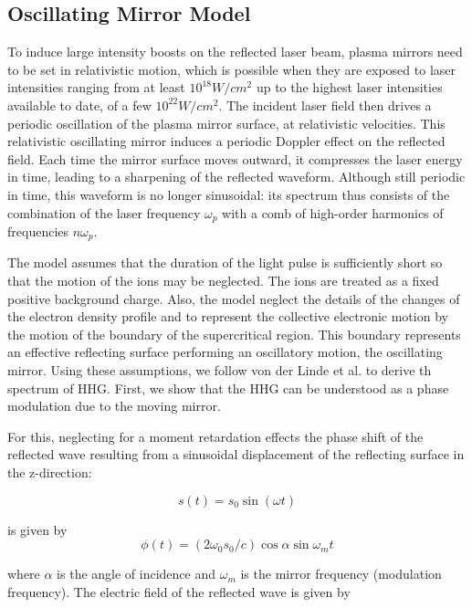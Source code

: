 \documentclass[12pt]{article}
\begin{document}
\subsection{Oscillating Mirror Model}
To induce large intensity boosts on the reflected laser beam, plasma mirrors need to be set in relativistic motion, which is possible when they are exposed to laser intensities ranging from at least $10^{18} W/cm^2$ up to the highest laser intensities available to date, of a few $10^{22} W/cm^2$. The incident laser field then drives a periodic oscillation of the plasma mirror surface, at relativistic velocities. This relativistic oscillating mirror induces a periodic Doppler effect on the reflected field. Each time the mirror surface moves outward, it compresses the laser energy in time, leading to a sharpening of the reflected waveform. Although still periodic in time, this waveform is no longer sinusoidal: its spectrum thus consists of the combination of the laser frequency $\omega_p$ with a comb of high-order harmonics of frequencies $n\omega_p$.

The model assumes that the duration of the light pulse is sufficiently short so that the motion of the ions may be neglected. The ions are treated as a fixed positive background charge. Also, the model neglect the details of the changes of the electron density profile and to represent the collective electronic motion by the motion of the boundary of the supercritical region. This boundary represents an effective reflecting surface performing an oscillatory motion, the oscillating mirror. Using these assumptions, we follow von der Linde et al. \cite{hhg-main} to derive th spectrum of HHG. First, we show that the HHG can be understood as a phase modulation due to the moving mirror.

For this, neglecting for a moment retardation effects the phase shift of the reflected wave resulting from a sinusoidal displacement of the reflecting surface in the z-direction:

\begin{equation*}
    s(t) = s_0 \sin(\omega t)
\end{equation*}

is given by
\begin{equation*}
    \phi(t) = (2\omega_0s_0/c)\cos\alpha \sin \omega_m t
\end{equation*}

where $\alpha$ is the angle of incidence and $\omega_m$ is the mirror frequency (modulation frequency). The electric field of the reflected wave is given by
\end{document}

